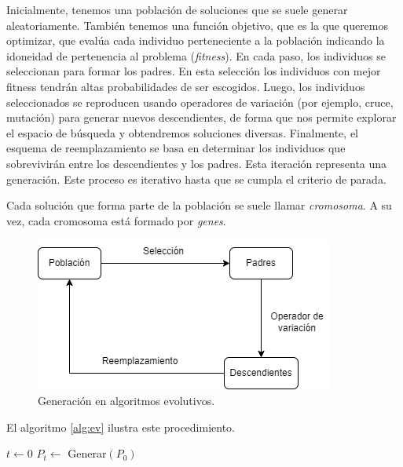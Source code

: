 Inicialmente, tenemos una población de soluciones que se suele generar aleatoriamente. También tenemos una función objetivo, que es la que queremos optimizar, que evalúa cada individuo perteneciente a la población indicando la idoneidad de pertenencia al problema (\emph{fitness}). En cada paso, los individuos se seleccionan para formar los padres. En esta selección los individuos con mejor fitness tendrán altas probabilidades de ser escogidos. Luego, los individuos seleccionados se reproducen usando operadores de variación (por ejemplo, cruce, mutación) para generar nuevos descendientes, de forma que nos permite explorar el espacio de búsqueda y obtendremos soluciones diversas. Finalmente, el esquema de reemplazamiento se basa en determinar los individuos que sobrevivirán entre los descendientes y los padres. Esta iteración representa una generación. Este proceso es iterativo hasta que se cumpla el criterio de parada.

Cada solución que forma parte de la población se suele llamar \emph{cromosoma}. A su vez, cada cromosoma está formado por \emph{genes}.

\begin{figure}[H]   
	\center
	\includegraphics[scale=0.5]{figures/Algoritmos_evolutivos.png}
	\caption{Generación en algoritmos evolutivos.}
    \label{fg:alg_ev}
\end{figure}

El algoritmo \ref{alg:ev} ilustra este procedimiento.

\begin{Ualgorithm}[H]
    \label{alg:ev}
    \small
    \DontPrintSemicolon
    $t \longleftarrow 0$\;
    $P_t \longleftarrow$ Generar$(P_0)$ 

\end{Ualgorithm}

